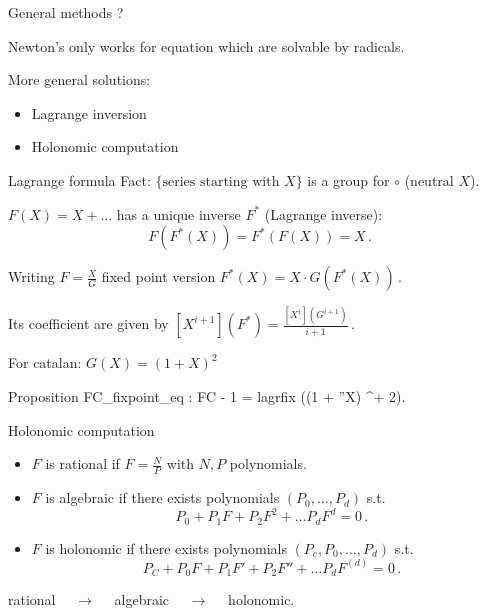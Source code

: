 \documentclass[compress,11pt]{beamer}
\renewcommand{\emph}[1]{{\color{red} #1}}
\begin{document}
\begin{frame}{General methods ?}

  \begin{PROBLEM}
    Newton's only works for equation which are solvable by radicals.
  \end{PROBLEM}
  \bigskip

  More general solutions:
  \begin{itemize}
  \item Lagrange inversion
  \item Holonomic computation
  \end{itemize}
\end{frame}

\begin{frame}[fragile]{Lagrange formula}
  Fact: $\{\text{series starting with } X\}$ is a group for $\circ$ (neutral $X$).
  \begin{PROP}
    $F(X)=X + \dots$ has a \emph{unique inverse} $F^*$ (Lagrange inverse):
    \[ F(F^*(X)) = F^*(F(X)) = X\,.\]

    Writing $F=\frac{X}{G}$ fixed point version
    $F^*(X) = X\cdot G(F^*(X))\,.$

    Its coefficient are given by
    $\displaystyle[X^{i+1}](F^*) = \frac{[X^{i}](G^{i+1})}{i+1}\,.$
  \end{PROP}
  For catalan: $G(X) = (1 + X)^2$
  \begin{coqcode}
Proposition FC_fixpoint_eq : FC - 1 = lagrfix ((1 + ''X) ^+ 2).
  \end{coqcode}
\end{frame}

\begin{frame}[fragile]{Holonomic computation}
  \begin{itemize}
  \item $F$ is \emph{rational} if $F = \frac{N}{P}$ with $N, P$ polynomials.
  \item $F$ is \emph{algebraic} if there exists polynomials
    $(P_0, \dots, P_d)$ s.t.
    \[P_0 + P_1 F + P_2 F^2 + \dots P_d F^d = 0\,.\]

  \item $F$ is \emph{holonomic} if there exists polynomials
    $(P_c, P_0, \dots, P_d)$ s.t.
    \[P_C + P_0 F + P_1 F' + P_2 F'' + \dots P_d F^{(d)} = 0\,.\]
  \end{itemize}
  \begin{theorem}
    \begin{center}
      rational $\quad\to\quad$ algebraic $\quad\to\quad$ holonomic.
    \end{center}
  \end{theorem}
\end{frame}
\end{document}
